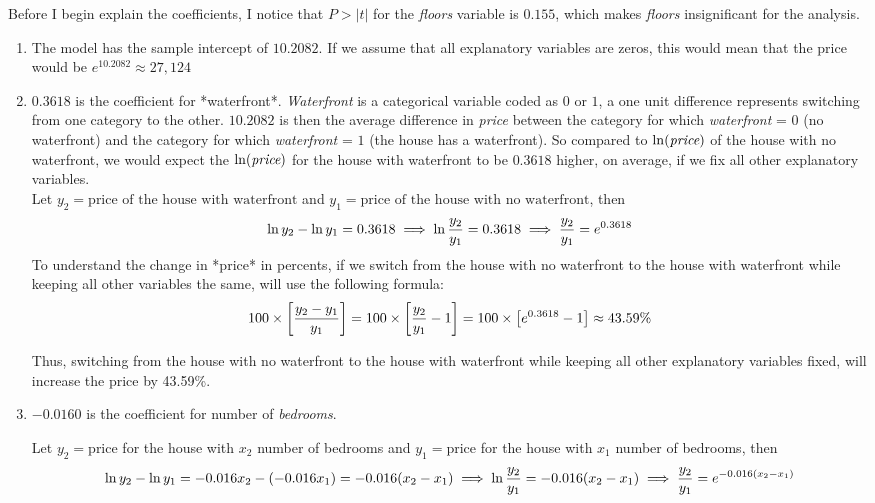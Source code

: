 \documentclass[10pt]{article}
\begin{document}
 Before I begin explain the coefficients, I notice that $P>|t|$ for the {\it floors} variable is $0.155$, which makes  {\it floors} insignificant for the analysis. 
 \begin{enumerate}
 	\item  The model has the sample intercept of $10.2082$.
If we assume that all explanatory variables are zeros, this would mean that the price would be $e^{10.2082}\approx 27,124$
 \item  $0.3618$ is the coefficient for *waterfront*.
 {\it Waterfront} is a categorical variable coded as $0$ or $1$, a one unit difference represents switching from one category to the other. $10.2082$ is then the average difference in  {\it price} between the category for which  {\it waterfront} = \(0\) (no waterfront) and the category for which  {\it waterfront} = \(1\) (the house has a waterfront). So compared to $\ln(\text{\it price})$ of the house with no waterfront, we would expect the $\ln(\text{\it price})$ for the house with waterfront to be $0.3618$ higher, on average, if we fix all other explanatory variables.\\
Let $y_2 = \text{price of the house with waterfront}$   and $y_1 = \text{price of the house with no waterfront}$, then 
$$
\large
\ln y_2 - \ln y_1 = 0.3618 \implies \ln \frac{y_2}{y_1} = 0.3618 \implies \frac{y_2}{y_1} = e^{0.3618}$$
To understand the change in *price* in percents, if we switch from the house with no waterfront to the house with waterfront while keeping all other variables the same, will use the following formula:
$$
\large
100\times \left[\frac{y_2-y_1}{y_1}\right]= 100\times \left[\frac{y_2}{y_1} - 1\right] = 100\times \left[ e^{0.3618} - 1\right] \approx 43.59\%$$

Thus, switching from the house with no waterfront to the house with waterfront while keeping all other explanatory variables fixed, will increase the price by 43.59\%.

 \item  $-0.0160$ is the coefficient for number of {\it bedrooms}.

Let $y_2 = \text{price}$ for the house with $x_2$ number of bedrooms and $y_1 = \text{price}$ for the house with $x_1$ number of bedrooms, then 
$$
\large
\ln y_2 - \ln y_1 = -0.016 x_2 - (-0.016 x_1) = -0.016 (x_2 - x_1) \implies \ln\frac{y_2}{y_1} = -0.016 (x_2-x_1)\implies \frac{y_2}{y_1} = e^{-0.016(x_2-x_1)}$$


\end{enumerate}
\end{document}
